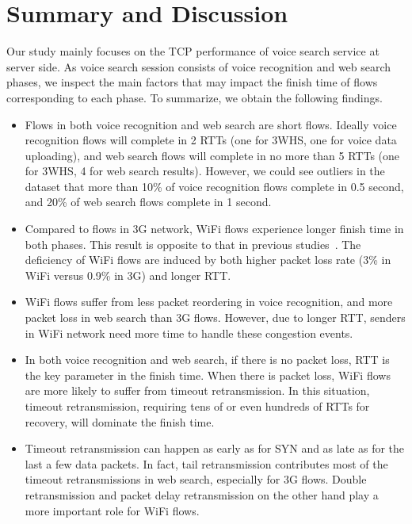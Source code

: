 
\section{Summary and Discussion}
\label{sec:discuss}

Our study mainly focuses on the TCP performance of voice search service at server side. As voice search session consists of voice recognition and web search phases, we inspect the main factors that may impact the finish time of flows corresponding to each phase. To summarize, we obtain the following findings.

\begin{itemize}
	\item Flows in both voice recognition and web search are short flows. Ideally voice recognition flows will complete in 2 RTTs (one for 3WHS, one for voice data uploading), and web search flows will complete in no more than 5 RTTs (one for 3WHS, 4 for web search results). However, we could see outliers in the dataset that more than 10\% of voice recognition flows complete in 0.5 second, and 20\% of web search flows complete in 1 second.

	\item Compared to flows in 3G network, WiFi flows experience longer finish time in both phases. This result is opposite to that in previous studies~\cite{deshpande2010performance,sommers2012cell}. The deficiency of WiFi flows are induced by both higher packet loss rate (3\% in WiFi versus 0.9\% in 3G) and longer RTT.

	\item WiFi flows suffer from less packet reordering in voice recognition, and more packet loss in web search than 3G flows. However, due to longer RTT, senders in WiFi network need more time to handle these congestion events.

	\item In both voice recognition and web search, if there is no packet loss, RTT is the key parameter in the finish time. When there is packet loss, WiFi flows are more likely to suffer from timeout retransmission. In this situation, timeout retransmission, requiring tens of or even hundreds of RTTs for recovery, will dominate the finish time.

	\item Timeout retransmission can happen as early as for SYN and as late as for the last a few data packets. In fact, tail retransmission contributes most of the timeout retransmissions in web search, especially for 3G flows. Double retransmission and packet delay retransmission on the other hand play a more important role for WiFi flows.
\end{itemize}

